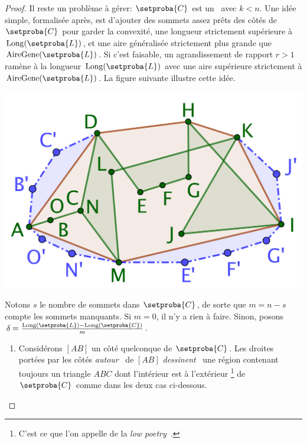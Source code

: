 \begin{proof}
	








	
	
	
	
	
	\smallskip
	
	Il reste un problème à gérer: $\setproba{C}$ est un \kgone\ avec $k < n$. 
	Une idée simple, formalisée après, est d'ajouter des sommets assez prêts des côtés de $\setproba{C}$ pour garder la convexité, une longueur strictement supérieure à $\perim{\setproba{L}}$, et une aire généralisée strictement plus grande que $\garea{\setproba{L}}$. Si c'est faisable, un agrandissement de rapport $r > 1$ ramène à la longueur $\perim{\setproba{L}}$ avec une aire supérieure strictement à $\garea{\setproba{L}}$.
	La figure suivante illustre cette idée.

	\begin{center}
		\includegraphics[scale=.4]{content/polygon/at-least-one/convex-hull-distortion.png}
	\end{center}


	Notons $s$ le nombre de sommets dans $\setproba{C}$, de sorte que $m = n - s$ compte les sommets manquants.
	Si $m = 0$, il n'y a rien à faire.
	Sinon, posons $\delta = \frac{\perim{\setproba{L}} - \perim{\setproba{C}}}{m}$.
	\begin{enumerate}
		\item \label{add-vertex-start}
		Considérons $[AB]$ un côté quelconque de $\setproba{C}$.
		Les droites portées par les côtés \og \emph{autour} \fg\ de $[AB]$ \og \emph{dessinent} \fg\ une région contenant toujours un triangle $ABC$ dont l'intérieur est à l'extérieur
		\footnote{
			C'est ce que l'on appelle de la \og \emph{low poetry} \fg\,.
		}
		de $\setproba{C}$ comme dans les deux cas ci-dessous.
		\begin{multicols}{2}
			\centering


\end{multicols}
\end{enumerate}
\end{proof}
